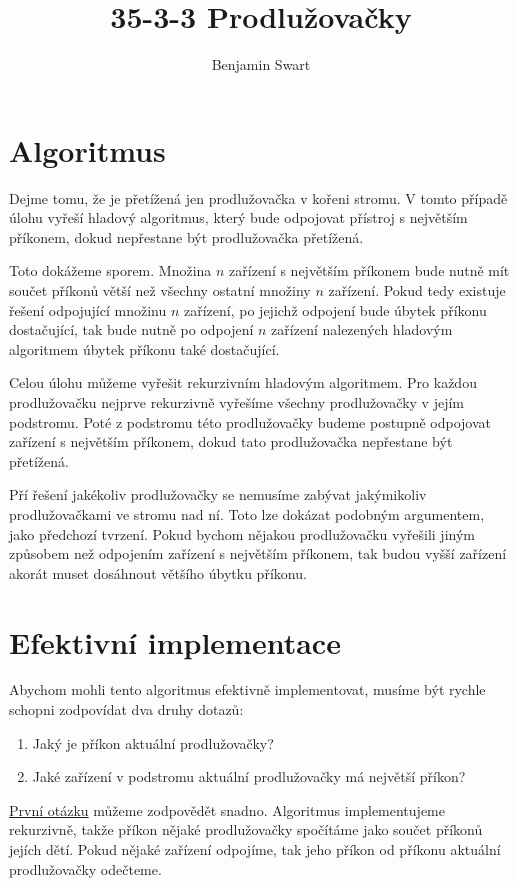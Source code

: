 \documentclass{article}
\title{35-3-3 Prodlužovačky}
\author{Benjamin Swart}
\begin{document}
\maketitle

\section{Algoritmus}

Dejme tomu, že je přetížená jen prodlužovačka v kořeni stromu. V tomto případě úlohu vyřeší hladový algoritmus, který bude odpojovat přístroj s největším příkonem, dokud nepřestane být prodlužovačka přetížená.

Toto dokážeme sporem. Množina $n$ zařízení s největším příkonem bude nutně mít součet příkonů větší než všechny ostatní množiny $n$ zařízení. Pokud tedy existuje řešení odpojující množinu $n$ zařízení, po jejichž odpojení bude úbytek příkonu dostačující, tak bude nutně po odpojení $n$ zařízení nalezených hladovým algoritmem úbytek příkonu také dostačující.

Celou úlohu můžeme vyřešit rekurzivním hladovým algoritmem. Pro každou prodlužovačku nejprve rekurzivně vyřešíme všechny prodlužovačky v jejím podstromu. Poté z podstromu této prodlužovačky budeme postupně odpojovat zařízení s největším příkonem, dokud tato prodlužovačka nepřestane být přetížená.

Pří řešení jakékoliv prodlužovačky se nemusíme zabývat jakýmikoliv prodlužovačkami ve stromu nad ní. Toto lze dokázat podobným argumentem, jako předchozí tvrzení. Pokud bychom nějakou prodlužovačku vyřešili jiným způsobem než odpojením zařízení s největším příkonem, tak budou vyšší zařízení akorát muset dosáhnout většího úbytku příkonu.

\section{Efektivní implementace}

Abychom mohli tento algoritmus efektivně implementovat, musíme být rychle schopni zodpovídat dva druhy dotazů:

\begin{enumerate}
    \item \label{question:load} Jaký je příkon aktuální prodlužovačky?
    \item \label{question:max} Jaké zařízení v podstromu aktuální prodlužovačky má největší příkon?
\end{enumerate}

\hyperref[question:load]{První otázku} můžeme zodpovědět snadno. Algoritmus implementujeme rekurzivně, takže příkon nějaké prodlužovačky spočítáme jako součet příkonů jejích dětí. Pokud nějaké zařízení odpojíme, tak jeho příkon od příkonu aktuální prodlužovačky odečteme.
\end{document}
